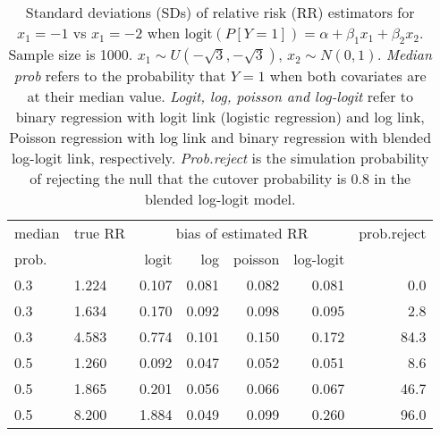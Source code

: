 \documentclass[12pt,a4paper]{article}
\begin{document}
\begin{table}[H] 
\small\sf\centering 
\caption{Standard deviations (SDs) of relative risk (RR) estimators for $x_1=-1$ vs $x_1=-2$ when $\mbox{logit}(P[Y=1])=\alpha+\beta_1 x_1 + \beta_2 x_2$. Sample size is 1000. $x_1 \sim $$U(-\sqrt{3},-\sqrt{3})$, $x_2 \sim N(0,1)$. {\it Median prob} refers to the probability that $Y=1$ when both covariates are at their median value. {\it Logit, log, poisson and log-logit} refer to binary regression with logit link (logistic regression) and log link, Poisson regression with log link and binary regression with blended log-logit link, respectively. {\it Prob.reject} is the simulation probability of rejecting the null that the cutover probability is $0.8$ in the blended log-logit model.} 
\begin{tabular}{llrrrrr} 
\toprule 
median & true RR & \multicolumn{4}{c}{bias of estimated RR} & prob.reject \\ 
prob. & & logit & log & poisson & log-logit  & \\ \midrule 
0.3 & 1.224 & 0.107 & 0.081 & 0.082 & 0.081 &  0.0 \\  
0.3 & 1.634 & 0.170 & 0.092 & 0.098 & 0.095 &  2.8 \\  
0.3 & 4.583 & 0.774 & 0.101 & 0.150 & 0.172 & 84.3 \\  
0.5 & 1.260 & 0.092 & 0.047 & 0.052 & 0.051 &  8.6 \\  
0.5 & 1.865 & 0.201 & 0.056 & 0.066 & 0.067 & 46.7 \\  
0.5 & 8.200 & 1.884 & 0.049 & 0.099 & 0.260 & 96.0 \\  
\bottomrule 
\end{tabular} 
\end{table} 
\end{document}
